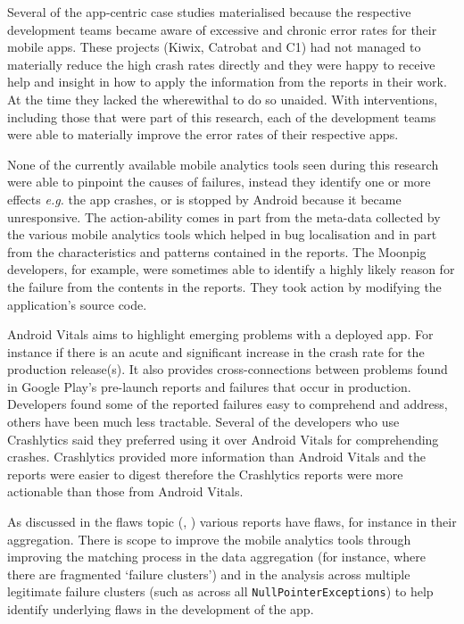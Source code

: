 Several of the app-centric case studies materialised because the respective development teams became aware of excessive and chronic error rates for their mobile apps. %
These projects (Kiwix, Catrobat and C1) had not managed to materially reduce the high crash rates directly and they were happy to receive help and insight in how to apply the information from the reports in their work. At the time they lacked the wherewithal to do so unaided. With interventions, including those that were part of this research, each of the development teams were able to materially improve the error rates of their respective apps.

None of the currently available mobile analytics tools seen during this research were able to pinpoint the causes of failures, instead they identify one or more effects \emph{e.g.} the app crashes, or is stopped by Android because it became unresponsive. The action-ability comes in part from the meta-data collected by the various mobile analytics tools which helped in bug localisation and in part from the characteristics and patterns contained in the reports. The Moonpig developers, for example, were sometimes able to identify a highly likely reason for the failure from the contents in the reports. They took action by modifying the application's source code.

Android Vitals aims to highlight emerging problems with a deployed app. For instance if there is an acute and significant increase in the crash rate for the production release(s). It also provides cross-connections between problems found in Google Play's pre-launch reports and failures that occur in production. Developers found some of the reported failures easy to comprehend and address, others have been much less tractable. Several of the developers who use Crashlytics said they preferred using it over Android Vitals for comprehending crashes. Crashlytics provided more information than Android Vitals and the reports were easier to digest therefore the Crashlytics reports were more actionable than those from Android Vitals.

As discussed in the flaws topic (, ) various reports have flaws, for instance in their aggregation. There is scope to improve the mobile analytics tools through improving the matching process in the data aggregation (for instance, where there are fragmented `failure clusters') and in the analysis across multiple legitimate failure clusters (such as across all \texttt{NullPointerExceptions}) to help identify underlying flaws in the development of the app.

